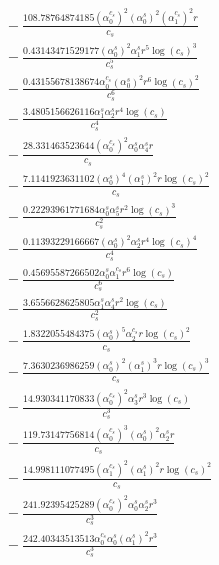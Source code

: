 \documentclass[10pt]{article}
\begin{document}
\begin{align*}
&{}  - \frac{108.78764874185 \left(\alpha_{0}^{c_s}\right)^{2} \left(\alpha_{0}^s\right)^{2} \left(\alpha_{1}^{c_s}\right)^{2} r}{c_{s}} \\
&{}  - \frac{0.43143471529177 \left(\alpha_{0}^s\right)^{2} \alpha_{1}^s r^{5} \log{\left(c_{s} \right)}^{3}}{c_{s}^{5}} \\
&{}  - \frac{0.43155678138674 \alpha_{0}^{c_s} \left(\alpha_{0}^s\right)^{2} r^{6} \log{\left(c_{s} \right)}^{2}}{c_{s}^{6}} \\
&{}  - \frac{3.4805156626116 \alpha_{1}^s \alpha_{2}^s r^{4} \log{\left(c_{s} \right)}}{c_{s}^{4}} \\
&{}  - \frac{28.331463523644 \left(\alpha_{0}^{c_s}\right)^{2} \alpha_{0}^s \alpha_{4}^s r}{c_{s}} \\
&{}  - \frac{7.1141923631102 \left(\alpha_{0}^s\right)^{4} \left(\alpha_{1}^s\right)^{2} r \log{\left(c_{s} \right)}^{2}}{c_{s}} \\
&{}  - \frac{0.22293961771684 \alpha_{0}^s \alpha_{5}^s r^{2} \log{\left(c_{s} \right)}^{3}}{c_{s}^{2}} \\
&{}  - \frac{0.11393229166667 \left(\alpha_{0}^s\right)^{2} \alpha_{2}^s r^{4} \log{\left(c_{s} \right)}^{4}}{c_{s}^{4}} \\
&{}  - \frac{0.45695587266502 \alpha_{0}^s \alpha_{1}^{c_s} r^{6} \log{\left(c_{s} \right)}}{c_{s}^{6}} \\
&{}  - \frac{3.6556628625805 \alpha_{1}^s \alpha_{4}^s r^{2} \log{\left(c_{s} \right)}}{c_{s}^{2}} \\
&{}  - \frac{1.8322055484375 \left(\alpha_{0}^s\right)^{5} \alpha_{2}^{c_s} r \log{\left(c_{s} \right)}^{2}}{c_{s}} \\
&{}  - \frac{7.3630236986259 \left(\alpha_{0}^s\right)^{2} \left(\alpha_{1}^s\right)^{3} r \log{\left(c_{s} \right)}^{3}}{c_{s}} \\
&{}  - \frac{14.930341170833 \left(\alpha_{0}^{c_s}\right)^{2} \alpha_{3}^s r^{3} \log{\left(c_{s} \right)}}{c_{s}^{3}} \\
&{}  - \frac{119.73147756814 \left(\alpha_{0}^{c_s}\right)^{3} \left(\alpha_{0}^s\right)^{2} \alpha_{2}^s r}{c_{s}} \\
&{}  - \frac{14.998111077495 \left(\alpha_{1}^{c_s}\right)^{2} \left(\alpha_{1}^s\right)^{2} r \log{\left(c_{s} \right)}^{2}}{c_{s}} \\
&{}  - \frac{241.92395425289 \left(\alpha_{0}^{c_s}\right)^{2} \alpha_{0}^s \alpha_{2}^s r^{3}}{c_{s}^{3}} \\
&{}  - \frac{242.40343513513 \alpha_{0}^{c_s} \alpha_{0}^s \left(\alpha_{1}^s\right)^{2} r^{3}}{c_{s}^{3}} \\

\end{align*}
\end{document}
